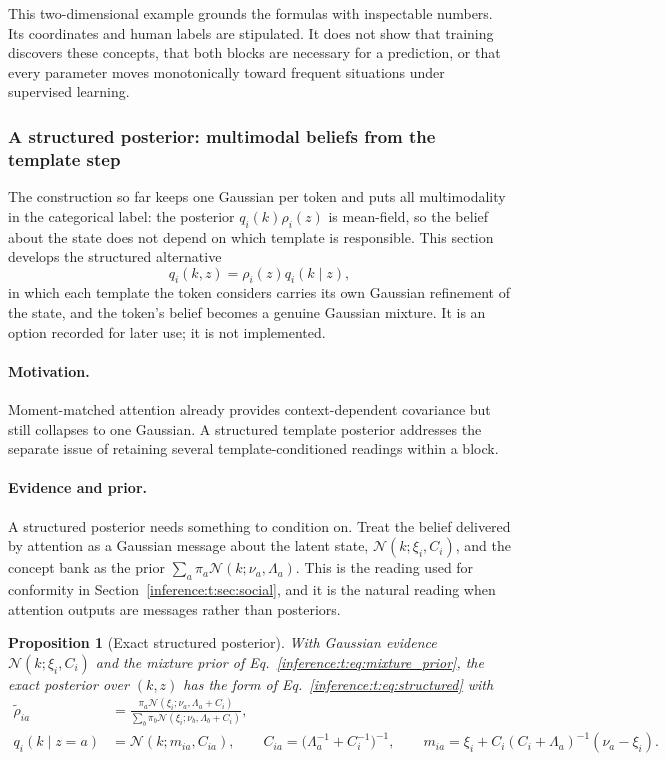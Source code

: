 \documentclass[11pt]{article}
\newtheorem{proposition}[theorem]{Proposition}
\theoremstyle{definition}
\theoremstyle{remark}
\providecommand{\N}{\mathcal{N}}
\begin{document}
This two-dimensional example grounds the formulas with inspectable numbers. Its coordinates and human labels are stipulated. It does not show that training discovers these concepts, that both blocks are necessary for a prediction, or that every parameter moves monotonically toward frequent situations under supervised learning.

\subsubsection{A structured posterior: multimodal beliefs from the template step}
\label{inference:t:sec:structured}

The construction so far keeps one Gaussian per token and puts all multimodality in the categorical label: the posterior $q_i(k)\rho_i(z)$ is mean-field, so the belief about the state does not depend on which template is responsible. This section develops the structured alternative
\begin{equation}
q_i(k,z)=\rho_i(z)q_i(k\mid z),
\label{inference:t:eq:structured}
\end{equation}
in which each template the token considers carries its own Gaussian refinement of the state, and the token's belief becomes a genuine Gaussian mixture. It is an option recorded for later use; it is not implemented.

\paragraph{Motivation.}
Moment-matched attention already provides context-dependent covariance but still collapses to one Gaussian. A structured template posterior addresses the separate issue of retaining several template-conditioned readings within a block.

\paragraph{Evidence and prior.}
A structured posterior needs something to condition on. Treat the belief delivered by attention as a Gaussian message about the latent state, $\N(k;\xi_i,C_i)$, and the concept bank as the prior $\sum_a\pi_a\N(k;\nu_a,\Lambda_a)$. This is the reading used for conformity in Section~\ref{inference:t:sec:social}, and it is the natural reading when attention outputs are messages rather than posteriors.

\begin{proposition}[Exact structured posterior]
\label{inference:t:prop:structured}
With Gaussian evidence $\N(k;\xi_i,C_i)$ and the mixture prior of Eq.~\eqref{inference:t:eq:mixture_prior}, the exact posterior over $(k,z)$ has the form of Eq.~\eqref{inference:t:eq:structured} with
\begin{align}
\tilde\rho_{ia}&=\frac{\pi_a\N(\xi_i;\nu_a,\Lambda_a+C_i)}{\sum_b\pi_b\N(\xi_i;\nu_b,\Lambda_b+C_i)},
\label{inference:t:eq:bayes_resp}\\
q_i(k\mid z=a)&=\N(k;m_{ia},C_{ia}),\qquad
C_{ia}=\bigl(\Lambda_a^{-1}+C_i^{-1}\bigr)^{-1},\qquad
m_{ia}=\xi_i+C_i(C_i+\Lambda_a)^{-1}(\nu_a-\xi_i).
\label{inference:t:eq:component}
\end{align}
\end{proposition}
\end{document}
